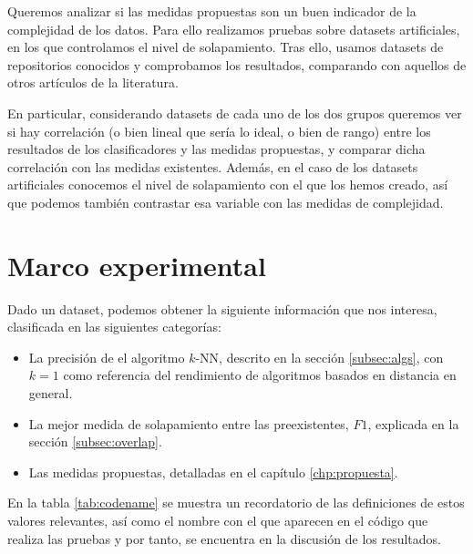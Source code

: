 \documentclass[a4paper,12pt]{report}
\theoremstyle{definition}
\begin{document}
Queremos analizar si las medidas propuestas son un buen indicador de la complejidad de los datos. Para ello realizamos pruebas sobre datasets artificiales, en los que controlamos el nivel de solapamiento.
Tras ello, usamos datasets de repositorios conocidos y comprobamos los resultados, comparando con aquellos de otros artículos de la literatura.

En particular, considerando datasets de cada uno de los dos grupos queremos ver si hay correlación (o bien lineal que sería lo ideal, o bien de rango) entre los resultados de los clasificadores y las medidas propuestas, y comparar dicha correlación con las medidas existentes. Además, en el caso de los datasets artificiales conocemos el nivel de solapamiento con el que los hemos creado, así que podemos también contrastar esa variable con las medidas de complejidad.

\section{Marco experimental}
\label{sec:marco}

Dado un dataset, podemos obtener la siguiente información que nos interesa, clasificada en las siguientes categorías:
\begin{itemize}
\item La precisión de el algoritmo $k$-NN, descrito en la sección \ref{subsec:algs}, con $k = 1$ como referencia del rendimiento de algoritmos basados en distancia en general.
\item La mejor medida de solapamiento entre las preexistentes, $F1$, explicada en la sección \ref{subsec:overlap}.
\item Las medidas propuestas, detalladas en el capítulo \ref{chp:propuesta}.
\end{itemize}

En la tabla \ref{tab:codename} se muestra un recordatorio de las definiciones de estos valores relevantes, así como el nombre con el que aparecen en el código que realiza las pruebas y por tanto, se encuentra en la discusión de los resultados.
\end{document}
